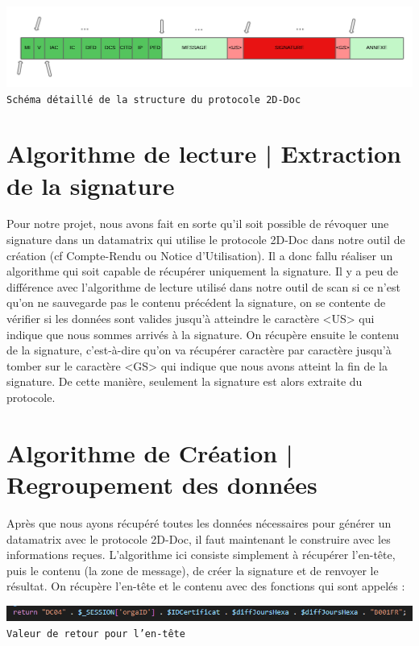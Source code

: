 \begin{center}
    \includegraphics[scale=0.20]{imgs/docTech.png}\\
    \texttt{Schéma détaillé de la structure du protocole 2D-Doc}
\end{center}

\newpage
\section{Algorithme de lecture | Extraction de la signature}

Pour notre projet, nous avons fait en sorte qu'il soit possible de révoquer une signature dans un datamatrix qui utilise le protocole 2D-Doc dans notre outil de création (cf Compte-Rendu ou Notice d'Utilisation). Il a donc fallu réaliser un algorithme qui soit capable de récupérer uniquement la signature. Il y a peu de différence avec l'algorithme de lecture utilisé dans notre outil de scan si ce n'est qu'on ne sauvegarde pas le contenu précédent la signature, on se contente de vérifier si les données sont valides jusqu'à atteindre le caractère <US> qui indique que nous sommes arrivés à la signature. On récupère ensuite le contenu de la signature, c'est-à-dire qu'on va récupérer caractère par caractère jusqu'à tomber sur le caractère <GS> qui indique que nous avons atteint la fin de la signature. De cette manière, seulement la signature est alors extraite du protocole.

\section{Algorithme de Création | Regroupement des données}

Après que nous ayons récupéré toutes les données nécessaires pour générer un datamatrix avec le protocole 2D-Doc, il faut maintenant le construire avec les informations reçues. L'algorithme ici consiste simplement à récupérer l'en-tête, puis le contenu (la zone de message), de créer la signature et de renvoyer le résultat. On récupère l'en-tête et le contenu avec des fonctions qui sont appelés :  
\begin{center}
    \includegraphics[scale=0.60]{imgs/Capture2.PNG}\\
    \texttt{Valeur de retour pour l'en-tête}
\end{center}

